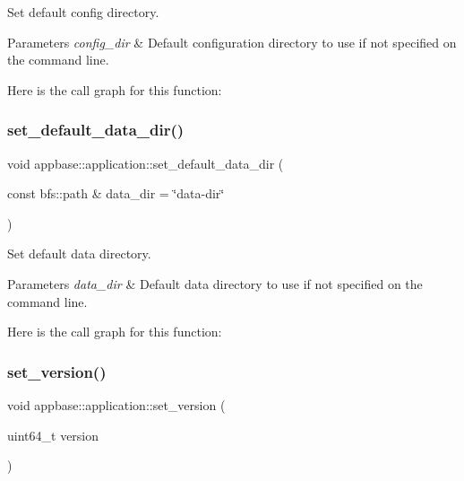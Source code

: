 Set default config directory. 


\begin{DoxyParams}{Parameters}
{\em config\+\_\+dir} & Default configuration directory to use if not specified on the command line. \\
\hline
\end{DoxyParams}
Here is the call graph for this function\+:
\mbox{\label{classappbase_1_1application_af81fa07af200b5b24049ed5d197a864f}} 
\subsubsection{\texorpdfstring{set\+\_\+default\+\_\+data\+\_\+dir()}{set\_default\_data\_dir()}}
{\footnotesize\ttfamily void appbase\+::application\+::set\+\_\+default\+\_\+data\+\_\+dir (\begin{DoxyParamCaption}\item[{const bfs\+::path \&}]{data\+\_\+dir = {\ttfamily \char`\"{}data-\/dir\char`\"{}} }\end{DoxyParamCaption})}



Set default data directory. 


\begin{DoxyParams}{Parameters}
{\em data\+\_\+dir} & Default data directory to use if not specified on the command line. \\
\hline
\end{DoxyParams}
Here is the call graph for this function\+:
\mbox{\label{classappbase_1_1application_a2794807d31e9f29f1327811dda40820d}} 
\subsubsection{\texorpdfstring{set\+\_\+version()}{set\_version()}}
{\footnotesize\ttfamily void appbase\+::application\+::set\+\_\+version (\begin{DoxyParamCaption}\item[{uint64\+\_\+t}]{version }\end{DoxyParamCaption})}



